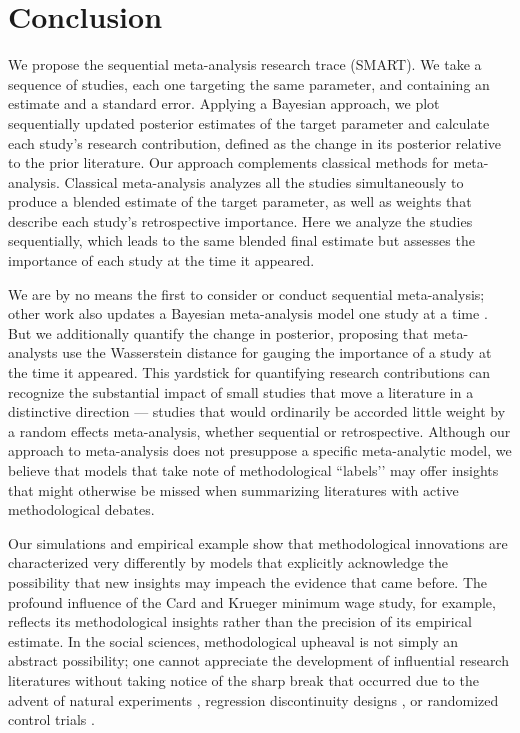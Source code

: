 \section{Conclusion}

We propose the sequential meta-analysis research trace (SMART). We take a sequence of studies, each one targeting the same parameter, and containing an estimate and a standard error. Applying a Bayesian approach, we plot sequentially updated 
posterior estimates of the target parameter and calculate each study's research contribution,
defined as the change in
its posterior relative to the prior literature. 
Our approach complements classical methods for meta-analysis.
Classical meta-analysis analyzes all the studies simultaneously to
produce a blended estimate of the target parameter, as well as weights that describe each study's
retrospective importance. Here we analyze the studies sequentially,
which leads to the same blended final estimate but assesses the importance
of each study at the time it appeared.


We are by no means the first to consider or conduct sequential meta-analysis; other work also updates a Bayesian meta-analysis model one study at a time \citep{Higgins_Whitehead_Simmonds_2011,Van_Der_Tweel_Bollen_2010,Bollen_Uiterwaal_Van_Vught_Van_Der_Tweel_2006}. But we additionally quantify the change in posterior, proposing that meta-analysts use the Wasserstein distance for gauging the importance of a study at the time it appeared.  This yardstick for quantifying research contributions can recognize the substantial impact of small studies that move a literature in a distinctive direction --- studies that would ordinarily be accorded little weight by a random effects meta-analysis, whether sequential or retrospective.  Although our approach to meta-analysis does not presuppose a specific meta-analytic model, we believe that models that take note of methodological ``labels’’ may offer insights that might otherwise be missed when summarizing literatures with active methodological debates.  


Our simulations and empirical example show that methodological innovations are characterized very differently by models that explicitly acknowledge the possibility that new insights may impeach the evidence that came before.
The profound influence of the Card and Krueger minimum wage study, for example, reflects its methodological insights rather than the precision of its empirical estimate.  In the social sciences, methodological upheaval is not simply an abstract possibility; one cannot appreciate the development of influential research literatures without taking notice of the sharp break that occurred due to the advent of natural experiments \citep{Ehrenberg_92}, regression discontinuity designs \citep{Thistlethwaite_60,Imbens_08}, or randomized control trials \citep{Angrist_10,Banerjee_16}.

